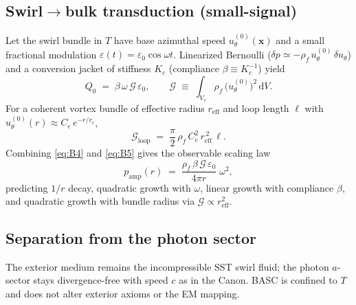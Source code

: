 \documentclass[10pt,reprint,aps,onecolumn,nofootinbib]{revtex4-2}
\begin{document}
    \subsection*{Swirl$\to$bulk transduction (small-signal)}
    Let the swirl bundle in $T$ have base azimuthal speed $u_\theta^{(0)}(\mathbf{x})$ and a small fractional modulation $\varepsilon(t)=\varepsilon_0\cos\omega t$. Linearized Bernoulli ($\delta p\simeq -\rho_f\,u_\theta^{(0)}\,\delta u_\theta$) and a conversion jacket of stiffness $K_c$ (compliance $\beta\equiv K_c^{-1}$) yield
    \begin{equation}
        Q_0 \;=\; \beta\,\omega\,\mathcal{G}\,\varepsilon_0,
        \qquad
        \mathcal{G}\;\equiv\;\int_{V_s}\rho_f\,\big(u_\theta^{(0)}\big)^2\,\mathrm{d}V.
        \label{eq:B5}
    \end{equation}
    For a coherent vortex bundle of effective radius $r_{\mathrm{eff}}$ and loop length $\ell$ with $u_\theta^{(0)}(r)\approx C_e\,e^{-r/r_c}$,
    \begin{equation}
        \mathcal{G}_{\mathrm{loop}}
        \;=\;
        \frac{\pi}{2}\,\rho_f\,C_e^{2}\,r_{\mathrm{eff}}^{\,2}\,\ell.
        \label{eq:B6}
    \end{equation}
    Combining \eqref{eq:B4} and \eqref{eq:B5} gives the observable scaling law
    \begin{equation}
        p_{\mathrm{amp}}(r)
        \;=\;
        \frac{\rho_f\,\beta\,\mathcal{G}\,\varepsilon_0}{4\pi r}\;\omega^{2},
        \label{eq:B7}
    \end{equation}
    predicting $1/r$ decay, quadratic growth with $\omega$, linear growth with compliance $\beta$, and quadratic growth with bundle radius via $\mathcal{G}\propto r_{\mathrm{eff}}^{2}$.

    \subsection*{Separation from the photon sector}
    The exterior medium remains the incompressible SST swirl fluid; the photon $a$-sector stays divergence-free with speed $c$ as in the Canon. BASC is confined to $T$ and does not alter exterior axioms or the EM mapping.



\end{document}
